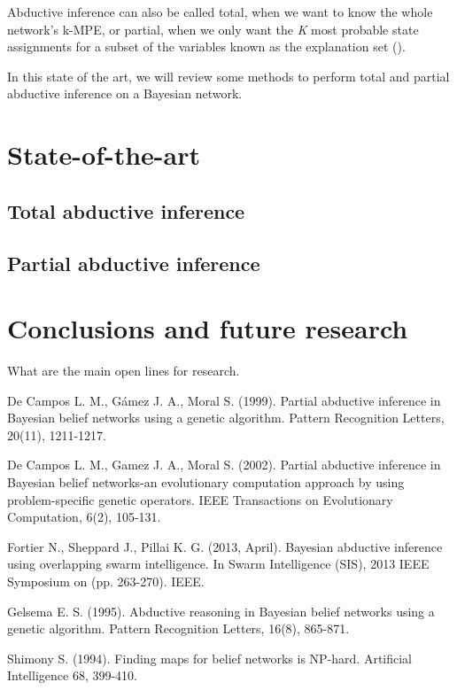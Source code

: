 \documentclass[a4paper,11pt]{article}
\begin{document}
Abductive inference can also be called total, when we want to know the whole network's k-MPE, or partial, when we only want the \textit{K} most probable state assignments for a subset of the variables known as the explanation set 
(\cite{fortier2013}).

In this state of the art, we will review some methods to perform total and partial abductive inference on a Bayesian network.

\section{State-of-the-art}



\subsection{Total abductive inference}

\subsection{Partial abductive inference}



\section{Conclusions and future research}

What are the main open lines for research.




\begin{thebibliography}{}

De Campos L. M., Gámez J. A., Moral S. (1999). Partial abductive inference in Bayesian belief networks using a genetic algorithm. Pattern Recognition Letters, 20(11), 1211-1217.

De Campos L. M., Gamez J. A., Moral S. (2002). Partial abductive inference in Bayesian belief networks-an evolutionary computation approach by using problem-specific genetic operators. IEEE Transactions on Evolutionary Computation, 6(2), 105-131.

Fortier N., Sheppard J., Pillai K. G. (2013, April). Bayesian abductive inference using overlapping swarm intelligence. In Swarm Intelligence (SIS), 2013 IEEE Symposium on (pp. 263-270). IEEE.

Gelsema E. S. (1995). Abductive reasoning in Bayesian belief networks using a genetic algorithm. Pattern Recognition Letters, 16(8), 865-871.

Shimony S. (1994). Finding maps for belief networks is NP-hard. Artificial Intelligence 68, 399-410.

\end{thebibliography}
\end{document}
